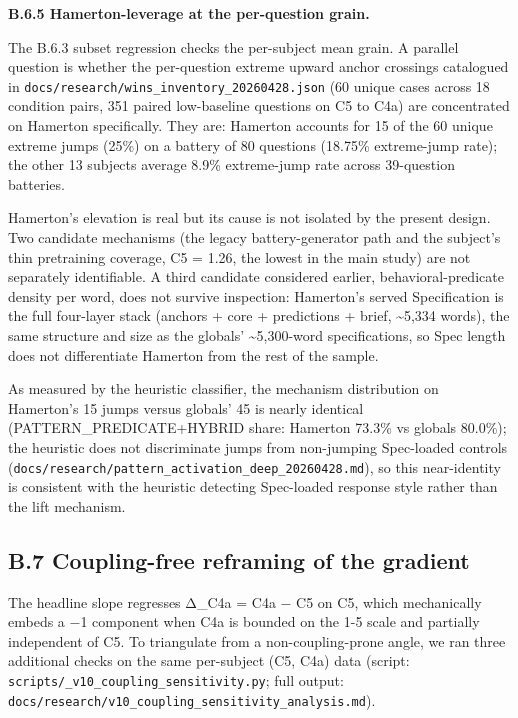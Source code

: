 \textbf{B.6.5 Hamerton-leverage at the per-question grain.}

The B.6.3 subset regression checks the per-subject mean grain. A
parallel question is whether the per-question extreme upward anchor
crossings catalogued in
\texttt{docs/research/wins\_inventory\_20260428.json} (60 unique cases
across 18 condition pairs, 351 paired low-baseline questions on C5 to
C4a) are concentrated on Hamerton specifically. They are: Hamerton
accounts for 15 of the 60 unique extreme jumps (25\%) on a battery of 80
questions (18.75\% extreme-jump rate); the other 13 subjects average
8.9\% extreme-jump rate across 39-question batteries.

Hamerton's elevation is real but its cause is not isolated by the
present design. Two candidate mechanisms (the legacy battery-generator
path and the subject's thin pretraining coverage, C5 = 1.26, the lowest
in the main study) are not separately identifiable. A third candidate
considered earlier, behavioral-predicate density per word, does not
survive inspection: Hamerton's served Specification is the full
four-layer stack (anchors + core + predictions + brief,
\textasciitilde5,334 words), the same structure and size as the globals'
\textasciitilde5,300-word specifications, so Spec length does not
differentiate Hamerton from the rest of the sample.

As measured by the heuristic classifier, the mechanism distribution on
Hamerton's 15 jumps versus globals' 45 is nearly identical
(PATTERN\_PREDICATE+HYBRID share: Hamerton 73.3\% vs globals 80.0\%);
the heuristic does not discriminate jumps from non-jumping Spec-loaded
controls
(\texttt{docs/research/pattern\_activation\_deep\_20260428.md}), so this
near-identity is consistent with the heuristic detecting Spec-loaded
response style rather than the lift mechanism.

\hypertarget{b.7-coupling-free-reframing-of-the-gradient}{%
\subsection{B.7 Coupling-free reframing of the
gradient}\label{b.7-coupling-free-reframing-of-the-gradient}}

The headline slope regresses Δ\_C4a = C4a − C5 on C5, which mechanically
embeds a −1 component when C4a is bounded on the 1-5 scale and partially
independent of C5. To triangulate from a non-coupling-prone angle, we
ran three additional checks on the same per-subject (C5, C4a) data
(script: \texttt{scripts/\_v10\_coupling\_sensitivity.py}; full output:
\texttt{docs/research/v10\_coupling\_sensitivity\_analysis.md}).

